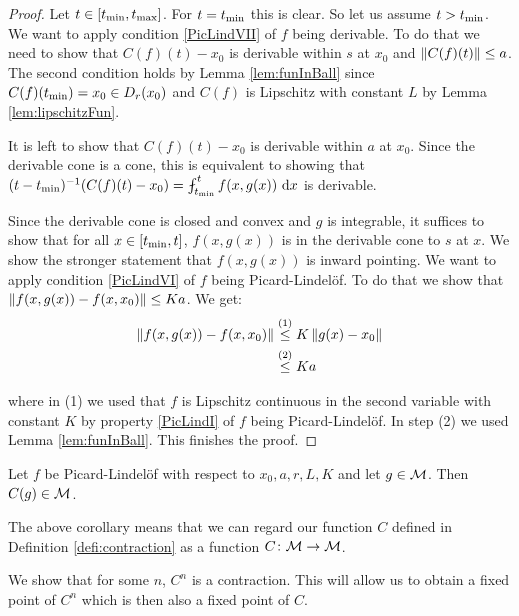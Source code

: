 \begin{proof}
Let $t \in [t_{\text{min}}, t_{\text{max}}]$. 
For $t = t_{\text{min}}$ this is clear. 
So let us assume $t > t_{\text{min}}$.
We want to apply condition \ref{PicLindVII} of $f$ being derivable. 
To do that we need to show that $C(f)(t) - x_0$ is derivable within $s$ at $x_0$ and $\left\lVert C(f)(t)\right\rVert \le a$. 
The second condition holds by Lemma \ref{lem:funInBall} since 
$C(f)(t_{\text{min}}) = x_0 \in D_{r}(x_0)$ and $C(f)$ is Lipschitz with constant $L$ by Lemma \ref{lem:lipschitzFun}. 

It is left to show that $C(f)(t) - x_0$ is derivable within $a$ at $x_0$. 
Since the derivable cone is a cone, this is equivalent to showing that $(t - \minsub{t})^{-1} (C(f)(t) - x_0) = \fint_{\minsub{t}}^t f(x, g(x)) \diff x$ is derivable. 

Since the derivable cone is closed and convex and $g$ is integrable, it suffices to show that for all $x \in [t_{\text{min}}, t]$, $f(x, g(x))$ is in the derivable cone to $s$ at $x$.
We show the stronger statement that $f(x, g(x))$ is inward pointing. 
We want to apply condition \ref{PicLindVI} of $f$ being Picard-Lindelöf. 
To do that we show that $\left\lVert f(x, g(x)) - f(x, x_0)\right\rVert \le Ka$. 
We get: 
\begin{equation*}
    \begin{split}
        \left\lVert f(x, g(x)) - f(x, x_0)\right\rVert &\stackrel{(1)}{\le} K \left\lVert g(x) - x_0\right\rVert \\
        &\stackrel{(2)}{\le} K a 
    \end{split}
\end{equation*}

where in (1) we used that $f$ is Lipschitz continuous in the second variable with constant $K$ by property \ref{PicLindI} of $f$ being Picard-Lindelöf. 
In step (2) we used Lemma \ref{lem:funInBall}. 
This finishes the proof.
\end{proof}

\begin{cor}
Let $f$ be Picard-Lindelöf with respect to $x_0, a, r, L, K$ and let $g \in \mathcal{M}$. 
Then $C(g) \in \mathcal{M}$.
\end{cor}

The above corollary means that we can regard our function $C$ defined in Definition \ref{defi:contraction} as a function $C \colon \mathcal{M} \to \mathcal{M}$. 

We show that for some $n$, $C^n$ is a contraction. 
This will allow us to obtain a fixed point of $C^n$ which is then also a fixed point of $C$. 

